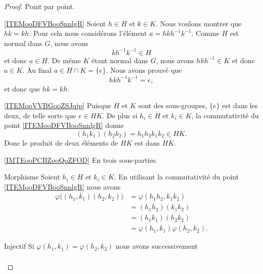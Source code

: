 \begin{proof}
	Point par point.
	\begin{subproof}
		\item[\ref{ITEMooDFVBooSnnlgR}]
		Soient \( h\in H\) et \( k\in K\). Nous voulons montrer que \( hk=kh\). Pour cela nous considérons l'élément \( a=hkh^{-1}k^{-1}\). Comme \( H \) est normal dans \( G\), nous avons
		\begin{equation}
			kh^{-1}k^{-1}\in H
		\end{equation}
		et donc \( a\in H\). De même \( K\) étant normal dans \( G\), nous avons \( hkh^{-1}\in K\) et donc \( a\in K\). Au final \( a\in H\cap K=\{ e \}\). Nous avons prouvé que
		\begin{equation}
			hkh^{-1}k^{-1}=e,
		\end{equation}
		et donc que \( hk=kh\).
		\item[\ref{ITEMooVVBGooZSJqjp}]
		Puisque \( H\) et \( K\) sont des sous-groupes, \( \{ e \}\) est dans les deux, de telle sorte que \( e\in HK\). De plus si \( h_i\in H\) et \( k_i\in K\), la commutativité du point \ref{ITEMooDFVBooSnnlgR} donne
		\begin{equation}
			(h_1k_1)(h_2k_2)=h_1h_2k_1k_2\in HK.
		\end{equation}
		Donc le produit de deux éléments de \( HK\) est dans $HK$.
		\item[\ref{IMTEooPCBZooQoZFOD}]
		En trois sous-parties.
		\begin{subproof}
			\item[Morphisme]
			Soient \( h_i\in H\) et \( k_i\in K\). En utilisant la commutativité du point \ref{ITEMooDFVBooSnnlgR} nous avons
			\begin{subequations}
				\begin{align}
					\varphi\big( (h_1,k_1)(h_2,k_2) \big) & =\varphi(h_1h_2,k_1k_2)            \\
					                                      & =(h_1h_2)(k_1k_2)                  \\
					                                      & =(h_1k_1)(h_2k_2)                  \\
					                                      & =\varphi(h_1,k_1)\varphi(h_2,k_2).
				\end{align}
			\end{subequations}
			\item[Injectif]
			Si \( \varphi(h_1,k_1)=\varphi(h_2,k_2)\) nous avons successivement
			\begin{subequations}
				\begin{align}

\end{align}
\end{subequations}
\end{subproof}
\end{subproof}
\end{proof}
